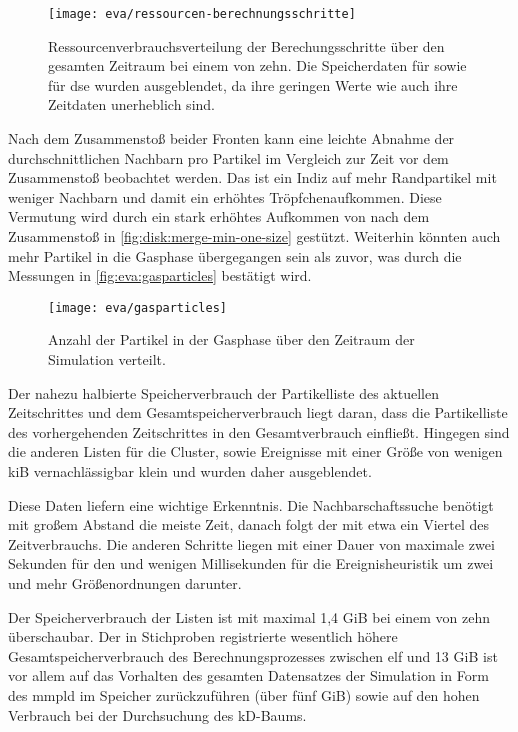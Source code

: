 \begin{figure}
	\texttt{[image: eva/ressourcen-berechnungsschritte]}
	\caption{Ressourcenverbrauchsverteilung der Berechungsschritte über den gesamten Zeitraum bei einem  von zehn. Die Speicherdaten für \SECC sowie für \gls{dse} wurden ausgeblendet, da ihre geringen Werte wie auch ihre Zeitdaten unerheblich sind.}\label{fig:eva:ressourcen-berechnungsschritte}
\end{figure}

Nach dem Zusammenstoß beider Fronten kann eine leichte Abnahme der durchschnittlichen Nachbarn pro Partikel im Vergleich zur Zeit vor dem Zusammenstoß beobachtet werden. Das ist ein Indiz auf mehr Randpartikel mit weniger Nachbarn und damit ein erhöhtes Tröpfchenaufkommen. Diese Vermutung wird durch ein stark erhöhtes Aufkommen von  nach dem Zusammenstoß in \autoref{fig:disk:merge-min-one-size} gestützt. Weiterhin könnten auch mehr Partikel in die Gasphase übergegangen sein als zuvor, was durch die Messungen in \autoref{fig:eva:gasparticles} bestätigt wird.

\begin{figure}
	\texttt{[image: eva/gasparticles]}
	\caption{Anzahl der Partikel in der Gasphase über den Zeitraum der Simulation verteilt.}\label{fig:eva:gasparticles}
\end{figure}

Der nahezu halbierte Speicherverbrauch der Partikelliste des aktuellen Zeitschrittes und dem Gesamtspeicherverbrauch liegt daran, dass die Partikelliste des vorhergehenden Zeitschrittes in den Gesamtverbrauch einfließt. Hingegen sind die anderen Listen für die Cluster,  sowie Ereignisse mit einer Größe von wenigen \gls{kiB} vernachlässigbar klein und wurden daher ausgeblendet.

Diese Daten liefern eine wichtige Erkenntnis. Die Nachbarschaftssuche benötigt mit großem Abstand die meiste Zeit, danach folgt der \CFD mit etwa ein Viertel des Zeitverbrauchs. Die anderen Schritte liegen mit einer Dauer von maximale zwei Sekunden für den \SECC und wenigen Millisekunden für die Ereignisheuristik um zwei und mehr Größenordnungen darunter.

Der Speicherverbrauch der Listen ist mit maximal 1,4 \gls{GiB} bei einem  von zehn überschaubar. Der in Stichproben registrierte wesentlich höhere Gesamtspeicherverbrauch des Berechnungsprozesses zwischen elf und 13 \gls{GiB} ist vor allem auf das Vorhalten des gesamten Datensatzes der Simulation in Form des \gls{mmpld} im Speicher zurückzuführen (über fünf \gls{GiB}) sowie auf den hohen Verbrauch bei der Durchsuchung des kD-Baums.


